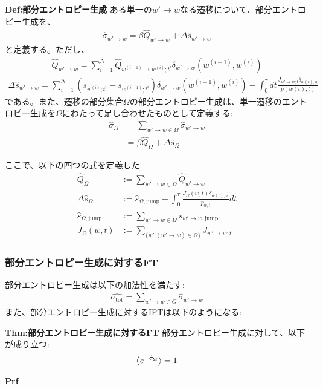 \documentclass[a4paper,11pt]{jsarticle}
\numberwithin{equation}{section}
\begin{document}
\begin{itembox}[l]{\textbf{Def:部分エントロピー生成}}
    ある単一の$w' \to w$なる遷移について、部分エントロピー生成を、
    \begin{align}
        \hat{\sigma}_{w' \to w} = \beta \hat{Q}_{w' \to w} + \Delta \hat{s}_{w' \to w}
    \end{align}
    と定義する。ただし、
    \begin{align}
        \hat{Q}_{w' \to w} = \sum_{i = 1}^{N} \hat{Q}_{w^{(i-1)} \to w^{(i)};t^i}\delta_{w'\to w}(w^{(i-1)}, w^{(i)})
    \end{align}
    \begin{align}
        \Delta \hat{s}_{w' \to w} = \sum_{i=1}^{N} (s_{w^{(i)};t^i} - s_{w^{(i-1)};t^i})\delta_{w'\to w}(w^{(i-1)}, w^{(i)}) -\int_{0}^{\tau} dt \frac{J_{w' \to w; t}\delta_{w(t), w}}{p(w(t), t)}
    \end{align}
    である。また、遷移の部分集合$\Omega$の部分エントロピー生成は、単一遷移のエントロピー生成を$\Omega$にわたって足し合わせたものとして定義する:
    \begin{align}
        \hat{\sigma}_{\Omega} &= \sum_{w' \to w \in \Omega} \hat{\sigma}_{w' \to w}\\
        &= \beta\hat{Q}_{\Omega} + \Delta \hat{s}_{\Omega}
    \end{align}

\end{itembox}
ここで、以下の四つの式を定義した:
\begin{align}
    \hat{Q}_\Omega &:= \sum_{w' \to w \in \Omega} \hat{Q}_{w' \to w} \\
    \Delta \hat{s}_\Omega &:= \hat{s}_{\Omega, \text{jump}} - \int_0^\tau \frac{J_\Omega(w, t) \delta_{w(t), w}}{p_{w,t}} dt\\
    \hat{s}_{\Omega, \text{jump}} &:= \sum_{w' \to w \in \Omega} \hat{s}_{w' \to w, \text{jump}} \\
    J_\Omega(w, t) &:= \sum_{\{w' | (w' \to w) \in \Omega\}} J_{w' \to w; t}
\end{align}

\subsubsection{部分エントロピー生成に対するFT}
部分エントロピー生成は以下の加法性を満たす:%
\begin{align}
    \hat{\sigma_{\text{tot}}} = \sum_{w' \to w \in G} \hat{\sigma}_{w' \to w}
\end{align}
また、部分エントロピー生成に対するIFTは以下のようになる:
\begin{itembox}[l]{\textbf{Thm:部分エントロピー生成に対するFT}}
    部分エントロピー生成に対して、以下が成り立つ:
    \begin{align}
        \ev{e^{-\hat{\sigma}_\Omega}} = 1
    \end{align}
\end{itembox}
\textbf{Prf}\\
\end{document}
